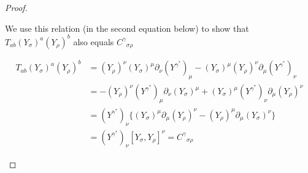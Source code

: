 \begin{proof}
\begin{enumerate}[label=(\alph*)]
    We use this relation (in the second equation below) to show that $T_{ab}(Y_\sigma)^a(Y_\rho)^b$ also equals ${C^\gamma}_{\sigma\rho}$

    \[\begin{aligned}
        T_{ab}(Y_\sigma)^a(Y_\rho)^b&=(Y_\rho)^\nu(Y_\sigma)^\mu\partial_\nu(Y^{\gamma^*})_\mu-(Y_\sigma)^\mu(Y_\rho)^\nu\partial_\mu(Y^{\gamma^*})_\nu  \\
        &=-(Y_\rho)^\nu(Y^{\gamma^*})_\mu\partial_\nu(Y_\sigma)^\mu+(Y_\sigma)^\mu(Y^{\gamma^*})_\nu\partial_\mu(Y_\rho)^\nu \\
        &=(Y^{\gamma^*})_\nu\{(Y_\sigma)^\mu\partial_\mu(Y_\rho)^\nu-(Y_\rho)^\mu\partial_\mu(Y_\sigma)^\nu\} \\
        &=(Y^{\gamma^*})_\nu[Y_\sigma,Y_\rho]^\nu={C^\gamma}_{\sigma\rho}
    \end{aligned}\]
\end{enumerate}
\end{proof}

